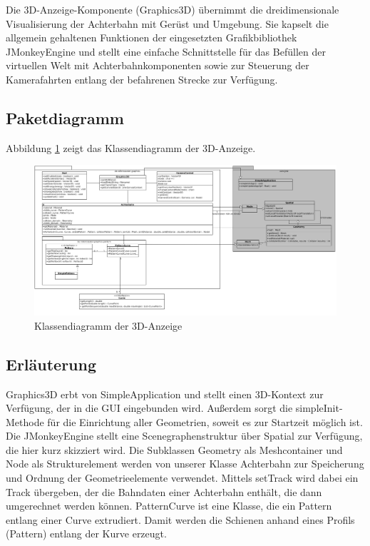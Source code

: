 Die 3D-Anzeige-Komponente (Graphics3D) übernimmt die dreidimensionale Visualisierung der Achterbahn
mit Gerüst und Umgebung. Sie kapselt die allgemein gehaltenen Funktionen der eingesetzten
Grafikbibliothek JMonkeyEngine und stellt eine einfache Schnittstelle für das Befüllen 
der virtuellen Welt mit Achterbahnkomponenten sowie zur Steuerung der Kamerafahrten 
entlang der befahrenen Strecke zur Verfügung.

\subsection{Paketdiagramm}
Abbildung \ref{fig:graphics} zeigt das Klassendiagramm der 3D-Anzeige.

\begin{figure}
\includegraphics[width=\linewidth]{bilder/klassendiagramm_006}
\caption{Klassendiagramm der 3D-Anzeige}
\label{fig:graphics}
\end{figure}

\subsection{Erläuterung}

Graphics3D erbt von SimpleApplication und stellt einen 3D-Kontext zur Verfügung, der in die GUI eingebunden wird. Außerdem sorgt die simpleInit-Methode für die Einrichtung aller Geometrien, soweit es zur Startzeit möglich ist.
Die JMonkeyEngine stellt eine Scenegraphenstruktur über Spatial zur Verfügung, die hier kurz skizziert wird. Die Subklassen Geometry als Meshcontainer und Node als Strukturelement werden von unserer Klasse Achterbahn 
zur Speicherung und Ordnung der Geometrieelemente verwendet. Mittels setTrack wird dabei ein Track übergeben, der die Bahndaten einer Achterbahn enthält, die dann umgerechnet werden können. PatternCurve ist eine Klasse, die ein Pattern entlang einer Curve extrudiert. 
Damit werden die Schienen anhand eines Profils (Pattern) entlang der Kurve erzeugt. 

